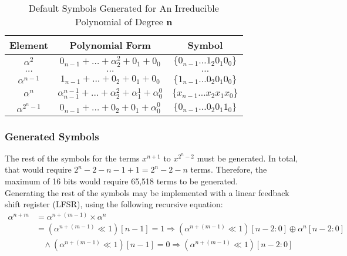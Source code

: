 \documentclass[paper=usletter, fontsize=12pt]{article}
\begin{document}
           \begin{table}[h]
                \def\arraystretch{2.5}
                \caption{Default Symbols Generated for An Irreducible Polynomial of Degree $\bm{n}$}
                \centering
                \begin{tabular*}{300pt}{@{\extracolsep{\fill}} ccc}

                \textbf{Element} & \textbf{Polynomial Form} & \textbf{Symbol} \\
                \hline
                $\alpha^{2}$        & $0_{n-1} + \ldots + \alpha^{2}_{2} + 0_{1} + 0_{0}$                                  & $\{0_{n-1}\ldots1_{2}0_{1}0_{0}\}$ \\
                $\ldots$            & $\ldots$                                                                             & $\ldots$ \\
                $\alpha^{n-1}$      & $1_{n-1} + \ldots + 0_{2} + 0_{1} + 0_{0}$                                           & $\{1_{n-1}\ldots 0_{2}0_{1}0_{0}\}$ \\
                $\alpha^{n}$        & $\alpha^{n-1}_{n-1} + \ldots + \alpha^{2}_{2} + \alpha^{1}_{1} + \alpha^{0}_{0}$     & $\{x_{n-1}\ldots x_{2}x_{1}x_{0}\}$ \\
                $\alpha^{2^{n}-1}$  & $0_{n-1} + \ldots + 0_{2} + 0_{1} + \alpha^{0}_{0}$                                  & $\{0_{n-1}\ldots0_{2}0_{1}1_{0}\}$ \\
                \end{tabular*}
            \end{table}
            \newpage

            \subsubsection{Generated Symbols}
            The rest of the symbols for the terms $x^{n+1}$ to $x^{2^{n}-2}$ must be generated. In total, that would require $2^{n}-2-n-1+1=2^{n}-2-n$ terms. Therefore, the maximum of 16 bits would require 65,518 terms to be generated. \\
            Generating the rest of the symbols may be implemented with a linear feedback shift register (LFSR), using the following recursive equation: \\

                \begin{equation*}
                    \begin{split}
                        \alpha^{n+m} & =\alpha^{n+(m-1)}\times \alpha^{n} \\
                        & = (\alpha^{n+(m-1)} \ll 1 )[n-1] = 1 \Longrightarrow ( \alpha^{n+(m-1)} \ll 1 )[n-2:0] \oplus \alpha^{n}[n-2:0] \\
                        & \ \ \ \ \wedge (\alpha^{n+(m-1)} \ll 1 )[n-1] = 0 \Longrightarrow ( \alpha^{n+(m-1)} \ll 1 )[n-2:0] \\
                    \end{split}
                \end{equation*}
\end{document}
